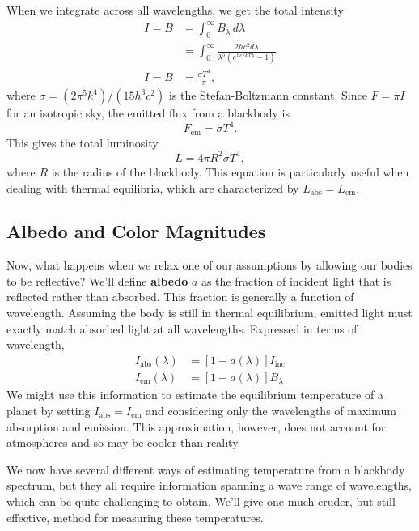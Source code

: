 \documentclass[../a062main.tex]{subfiles}
\begin{document}
When we integrate across all wavelengths, we get the total intensity
\begin{align*}
    I = B &= \int_{0}^{\infty} B_\lambda \,d\lambda \\
    &= \int_{0}^{\infty} \frac{2hc^2 d\lambda}{\lambda^{5} (e^{hc/kT\lambda} - 1)} \\
    I = B &= \frac{\sigma T^{4}}{\pi},
\end{align*}
where $\sigma = (2\pi^{5} k^{4}) / (15h^{3} c^2)$ is the Stefan-Boltzmann constant.
Since $F = \pi I$ for an isotropic sky, the emitted flux from a blackbody is
\[ \boxed{F_\textrm{em} = \sigma T^{4}}. \]
This gives the total luminosity
\[ \boxed{L = 4\pi R^2 \sigma T^{4}}, \]
where $R$ is the radius of the blackbody.
This equation is particularly useful when dealing with thermal equilibria, which are characterized by $L_\textrm{abs} = L_\textrm{em}$.

\subsection*{Albedo and Color Magnitudes}
Now, what happens when we relax one of our assumptions by allowing our bodies to be reflective?
We'll define \textbf{albedo} $a$ as the fraction of incident light that is reflected rather than absorbed.
This fraction is generally a function of wavelength.
Assuming the body is still in thermal equilibrium, emitted light must exactly match absorbed light at all wavelengths.
Expressed in terms of wavelength,
\begin{align*}
    I_\textrm{abs}(\lambda) &= \left[ 1 - a(\lambda) \right] I_\textrm{inc} \\
    I_\textrm{em}(\lambda) &= \left[ 1 - a(\lambda) \right] B_\lambda
\end{align*}
We might use this information to estimate the equilibrium temperature of a planet by setting $I_\textrm{abs} = I_\textrm{em}$ and considering only the wavelengths of maximum absorption and emission.
This approximation, however, does not account for atmospheres and so may be cooler than reality.

We now have several different ways of estimating temperature from a blackbody spectrum, but they all require information spanning a wave range of wavelengths, which can be quite challenging to obtain.
We'll give one much cruder, but still effective, method for measuring these temperatures.
\end{document}
